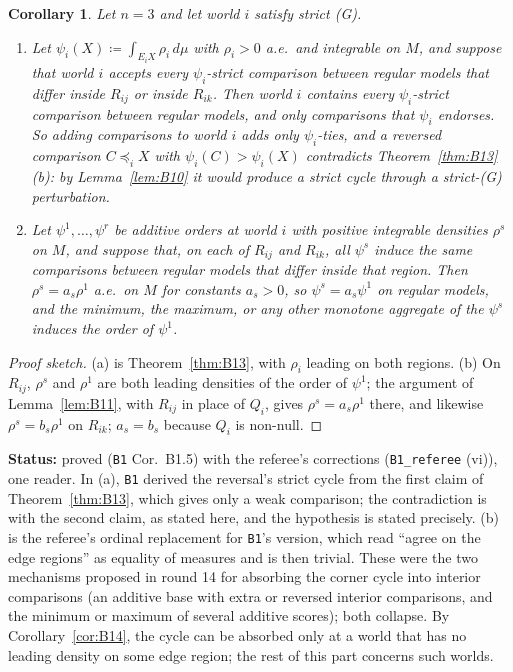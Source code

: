 \documentclass[11pt]{article}
\newtheorem{corollary}[theorem]{Corollary}
\theoremstyle{definition}
\theoremstyle{remark}
\newcommand{\src}[1]{\texttt{#1}}
\newcommand{\status}[1]{\par\smallskip\noindent\textbf{Status:} #1\par\smallskip}
\begin{document}
\begin{corollary}\label{cor:B15}
Let $n=3$ and let world $i$ satisfy strict (G).
\begin{enumerate}[leftmargin=*,label=(\alph*)]
\item Let $\psi_i(X)\coloneqq\int_{E_iX}\rho_i\,d\mu$ with $\rho_i>0$ a.e.\ and integrable on $M$, and suppose that world $i$ accepts every $\psi_i$-strict comparison between regular models that differ inside $R_{ij}$ or inside $R_{ik}$. Then world $i$ contains every $\psi_i$-strict comparison between regular models, and only comparisons that $\psi_i$ endorses. So adding comparisons to world $i$ adds only $\psi_i$-ties, and a reversed comparison $C\preceq_iX$ with $\psi_i(C)>\psi_i(X)$ contradicts Theorem~\ref{thm:B13}(b): by Lemma~\ref{lem:B10} it would produce a strict cycle through a strict-(G) perturbation.
\item Let $\psi^1,\dots,\psi^r$ be additive orders at world $i$ with positive integrable densities $\rho^s$ on $M$, and suppose that, on each of $R_{ij}$ and $R_{ik}$, all $\psi^s$ induce the same comparisons between regular models that differ inside that region. Then $\rho^s=a_s\rho^1$ a.e.\ on $M$ for constants $a_s>0$, so $\psi^s=a_s\psi^1$ on regular models, and the minimum, the maximum, or any other monotone aggregate of the $\psi^s$ induces the order of $\psi^1$.
\end{enumerate}
\end{corollary}
\begin{proof}[Proof sketch]
(a) is Theorem~\ref{thm:B13}, with $\rho_i$ leading on both regions. (b) On $R_{ij}$, $\rho^s$ and $\rho^1$ are both leading densities of the order of $\psi^1$; the argument of Lemma~\ref{lem:B11}, with $R_{ij}$ in place of $Q_i$, gives $\rho^s=a_s\rho^1$ there, and likewise $\rho^s=b_s\rho^1$ on $R_{ik}$; $a_s=b_s$ because $Q_i$ is non-null.
\end{proof}
\status{proved (\src{B1} Cor.~B1.5) with the referee's corrections (\src{B1\_referee} (vi)), one reader. In (a), \src{B1} derived the reversal's strict cycle from the first claim of Theorem~\ref{thm:B13}, which gives only a weak comparison; the contradiction is with the second claim, as stated here, and the hypothesis is stated precisely. (b) is the referee's ordinal replacement for \src{B1}'s version, which read ``agree on the edge regions'' as equality of measures and is then trivial. These were the two mechanisms proposed in round 14 for absorbing the corner cycle into interior comparisons (an additive base with extra or reversed interior comparisons, and the minimum or maximum of several additive scores); both collapse. By Corollary~\ref{cor:B14}, the cycle can be absorbed only at a world that has no leading density on some edge region; the rest of this part concerns such worlds.}
\end{document}

